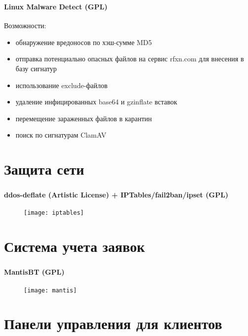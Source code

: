 \begin{frame}
\frametitle{\insertsection}
\framesubtitle{Linux Malware Detect (GPL)}
Возможности:
\begin{itemize}
	\item обнаружение вредоносов по хэш-сумме MD5
	\item отправка потенциально опасных файлов на сервис rfxn.com для внесения в базу сигнатур
	\item использование exclude-файлов
	\item удаление инфицированных base64 и gzinflate вставок
	\item перемещение зараженных файлов в карантин
	\item поиск по сигнатурам ClamAV
\end{itemize}
\end{frame}


\section{Защита сети}

\begin{frame}
\frametitle{\insertsection}
\framesubtitle{ddos-deflate (Artistic License) + IPTables/fail2ban/ipset (GPL)}
\begin{figure}[h]
	\center
	\texttt{[image: iptables]}
\end{figure}
\end{frame}


\section{Система учета заявок}

\begin{frame}
\frametitle{\insertsection}
\framesubtitle{MantisBT (GPL)}
\begin{figure}[h]
	\center
	\texttt{[image: mantis]}
\end{figure}
\end{frame}


\section{Панели управления для клиентов}

